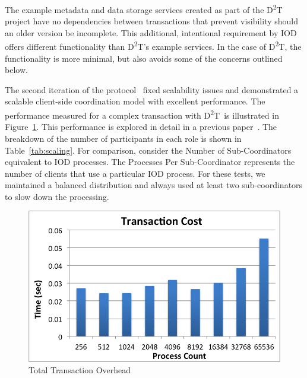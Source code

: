 \documentclass[conference]{IEEEtran}
\newcommand{\DDT}{D\textsuperscript{2}T~}
\newcommand{\DDTns}{D\textsuperscript{2}T}
\begin{document}
The example metadata and data storage services created as part of the \DDT
project have no dependencies between transactions that prevent visibility
should an older version be incomplete. This additional, intentional requirement
by IOD offers different functionality than \DDTns's example services. In the
case of \DDTns, the functionality is more minimal, but also avoids some of the
concerns outlined below.

The second iteration of the protocol~\cite{lofstead:2013:pdsw-txn} fixed
scalability issues and demonstrated a scalable client-side coordination model
with excellent performance. The performance measured for a complex transaction
with \DDT is illustrated in Figure~\ref{fig:performance}. This performance is
explored in detail in a previous paper~\cite{lofstead:2013:pdsw-txn}. The
breakdown of the number of participants in each role is shown in
Table~\ref{tab:scaling}. For comparison, consider the Number of
Sub-Coordinators equivalent to IOD processes. The Processes Per Sub-Coordinator
represents the number of clients that use a particular IOD process. For these
tests, we maintained a balanced distribution and always used at least two
sub-coordinators to slow down the processing.

\begin{figure}[ht]
\centering
\includegraphics[keepaspectratio=true, width=0.9\columnwidth]{images/performance}
\vspace{-0.15in}
\caption{Total Transaction Overhead}
\label{fig:performance}
\end{figure}
\end{document}
